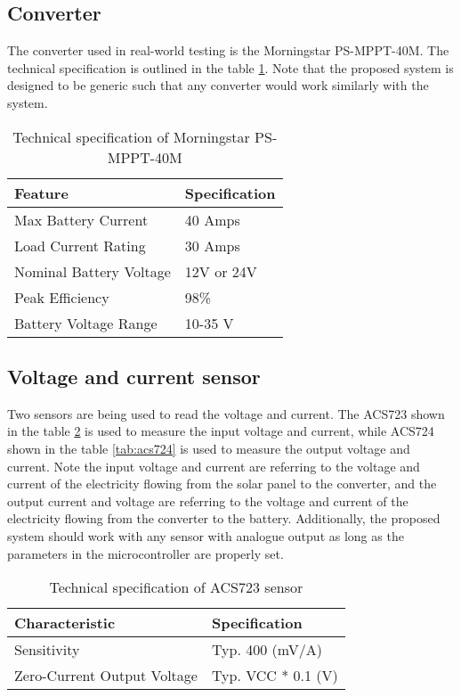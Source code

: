 \documentclass[../thesis.tex]{subfiles}
\begin{document}
\subsection{Converter}

The converter used in real-world testing is the Morningstar PS-MPPT-40M. The technical specification is outlined in the table \ref{tab:psmppt40m}. Note that the proposed system is designed to be generic such that any converter would work similarly with the system.

\begin{table}[h!]
\begin{center}
\caption{Technical specification of Morningstar PS-MPPT-40M}
\label{tab:psmppt40m}
\begin{tabular}{l|l}
\toprule
\textbf{Feature} & \textbf{Specification}\\
\midrule
Max Battery Current & 40 Amps\\
Load Current Rating & 30 Amps\\
Nominal Battery Voltage & 12V or 24V\\
Peak Efficiency & 98\%\\
Battery Voltage Range & 10-35 V\\
\bottomrule
\end{tabular}
\end{center}
\end{table}


\subsection{Voltage and current sensor}

Two sensors are being used to read the voltage and current. The ACS723 shown in the table \ref{tab:acs723} is used to measure the input voltage and current, while ACS724 shown in the table \ref{tab:acs724} is used to measure the output voltage and current. Note the input voltage and current are referring to the voltage and current of the electricity flowing from the solar panel to the converter, and the output current and voltage are referring to the voltage and current of the electricity flowing from the converter to the battery. Additionally, the proposed system should work with any sensor with analogue output as long as the parameters in the microcontroller are properly set.

\begin{table}[h!]
\begin{center}
\caption{Technical specification of ACS723 sensor}
\label{tab:acs723}
\begin{tabular}{l|l}
\toprule
\textbf{Characteristic} & \textbf{Specification}\\
\midrule
Sensitivity & Typ. 400 (mV/A)\\
Zero-Current Output Voltage & Typ. VCC * 0.1 (V)\\
\bottomrule
\end{tabular}
\end{center}
\end{table}
\end{document}
